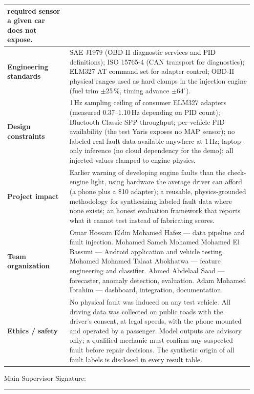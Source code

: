 \begin{longtable}{@{}p{}p{}@{}}
required sensor a given car does not expose.\\
\midrule
\textbf{Engineering standards} &
SAE J1979 (OBD-II diagnostic services and PID definitions); ISO 15765-4
(CAN transport for diagnostics); ELM327 AT command set for adapter control;
OBD-II physical ranges used as hard clamps in the injection engine (fuel
trim $\pm$25\,\%, timing advance $\pm$64$^{\circ}$).\\
\midrule
\textbf{Design constraints} &
1\,Hz sampling ceiling of consumer ELM327 adapters (measured 0.37--1.10\,Hz
depending on PID count); Bluetooth Classic SPP throughput; per-vehicle PID
availability (the test Yaris exposes no MAP sensor); no labeled real-fault
data available anywhere at 1\,Hz; laptop-only inference (no cloud
dependency for the demo); all injected values clamped to engine physics.\\
\midrule
\textbf{Project impact} &
Earlier warning of developing engine faults than the check-engine light,
using hardware the average driver can afford (a phone plus a
\$10 adapter); a reusable, physics-grounded methodology for synthesizing
labeled fault data where none exists; an honest evaluation framework that
reports what it cannot test instead of fabricating scores.\\
\midrule
\textbf{Team organization} &
Omar Hossam Eldin Mohamed Hafez --- data pipeline and fault injection.\newline
Mohamed Sameh Mohamed Mohamed El Bassuni --- Android application and vehicle testing.\newline
Mohamed Mohamed Talaat Abokhatwa --- feature engineering and classifier.\newline
Ahmed Abdelaal Saad --- forecaster, anomaly detection, evaluation.\newline
Adam Mohamed Ibrahim --- dashboard, integration, documentation.\\
\midrule
\textbf{Ethics / safety} &
No physical fault was induced on any test vehicle. All driving data was
collected on public roads with the driver's consent, at legal speeds, with
the phone mounted and operated by a passenger. Model outputs are advisory
only; a qualified mechanic must confirm any suspected fault before repair
decisions. The synthetic origin of all fault labels is disclosed in every
result table.\\
\bottomrule
\end{longtable}

\vspace{0.6cm}
\noindent Main Supervisor Signature: \rule{5cm}{0.3pt}

